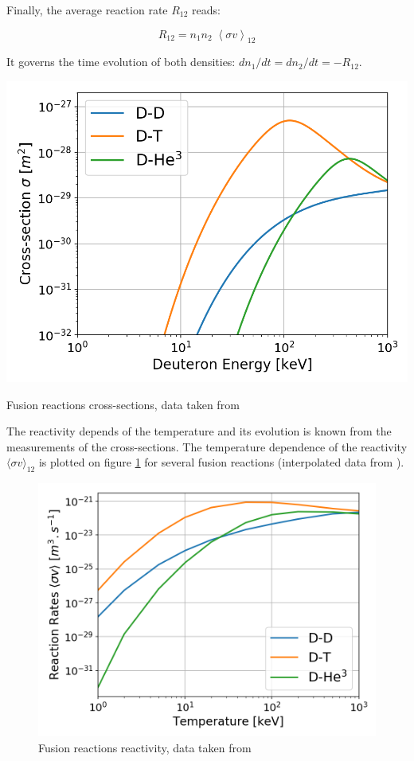 Finally, the average reaction rate $R_{12}$ reads:

\begin{equation*}
R_{12} = n_1 n_2 \; \left < \sigma v \right >_{12}
\end{equation*}

It governs the time evolution of both densities: $dn_1/dt = dn_2/dt = -R_{12}$.

\begin{marginfigure}[-3.8cm]
	\includegraphics[width=1\textwidth]{figures/Fusion_cross-section.png}
	\caption{Fusion reactions cross-sections, data taken from \cite{Huba2013} }
	\label{fig:crosssection_adv}
\end{marginfigure}

The reactivity depends of the temperature and its evolution is known from the measurements of the cross-sections. The temperature dependence of the reactivity $\langle \sigma v \rangle_{12}$ is plotted on figure \ref{fig:reactivity_adv} for several fusion reactions (interpolated data from ). 

\begin{figure}
	\includegraphics[width=1\textwidth]{figures/Fusion_Reactivity.png}
	\caption{Fusion reactions reactivity, data taken from \cite{Huba2013} }
	\label{fig:reactivity_adv}
\end{figure}

